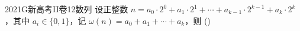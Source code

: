 
\begin{problem}{2021}{G}{新高考II卷}{12}{数列}
设正整数 $ n=a_0\cdot2^0+a_1\cdot2^1+\cdots+a_{k-1}\cdot2^{k-1}+a_k\cdot2^k $，其中 $ a_i\in\{0,1\} $，记 $ \omega(n)=a_0+a_1+\cdots+a_k $，则 (\hspace{1cm})

\begin{choices}
\end{choices}
\end{problem}

\begin{answer}

\end{answer}

\begin{solutions}

\end{solutions}